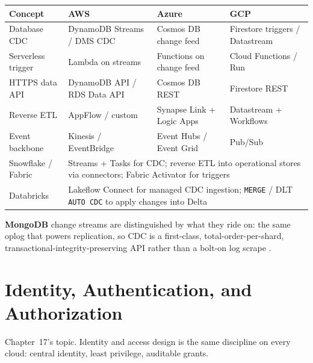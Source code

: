 \begin{center}
\footnotesize
\begin{tabular}{@{}p{2.9cm}p{3.0cm}p{3.0cm}p{3.0cm}@{}}
\toprule
\textbf{Concept} & \textbf{AWS} & \textbf{Azure} & \textbf{GCP} \\
\midrule
Database CDC & DynamoDB Streams / DMS CDC & Cosmos DB change feed & Firestore triggers / Datastream \\
Serverless trigger & Lambda on streams & Functions on change feed & Cloud Functions / Run \\
HTTPS data API & DynamoDB API / RDS Data API & Cosmos DB REST & Firestore REST \\
Reverse ETL & AppFlow / custom & Synapse Link + Logic Apps & Datastream + Workflows \\
Event backbone & Kinesis / EventBridge & Event Hubs / Event Grid & Pub/Sub \\
\addlinespace
Snowflake / Fabric & \multicolumn{3}{l}{Streams + Tasks for CDC; reverse ETL into operational stores via connectors; Fabric Activator for triggers} \\
Databricks & \multicolumn{3}{l}{Lakeflow Connect for managed CDC ingestion; \texttt{MERGE} / DLT \texttt{AUTO CDC} to apply changes into Delta} \\
\bottomrule
\end{tabular}
\end{center}

\noindent \textbf{MongoDB} change streams are distinguished by what they ride on: the same oplog
that powers replication, so CDC is a first-class, total-order-per-shard,
transactional-integrity-preserving API rather than a bolt-on log scrape
\cite{mongodbChangeStreamsDocs,mongodbOplogDocs}.

\section{Identity, Authentication, and Authorization}
%
Chapter~17's topic. Identity and access design is the same discipline on every cloud: central
identity, least privilege, auditable grants.

